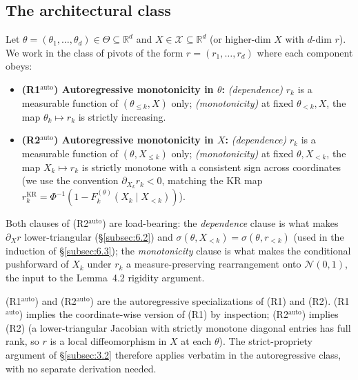 \documentclass[11pt]{article}
\providecommand{\tightlist}{\setlength{\itemsep}{0pt}\setlength{\parskip}{0pt}}
\begin{document}
\subsection{The architectural class}\label{subsec:6.1}

Let
\(\theta = (\theta_1, \ldots, \theta_d) \in \Theta \subseteq \mathbb{R}^d\)
and \(X \in \mathcal{X} \subseteq \mathbb{R}^d\) (or higher-dim \(X\)
with \(d\)-dim \(r\)). We work in the class of pivots of the form
\(r = (r_1, \ldots, r_d)\) where each component obeys:

\begin{itemize}
\tightlist
\item
  \textbf{(R1\(^\mathrm{auto}\)) Autoregressive monotonicity in
  \(\theta\):} \emph{(dependence)} \(r_k\) is a measurable function of
  \((\theta_{\le k}, X)\) only; \emph{(monotonicity)} at fixed
  \(\theta_{<k}, X\), the map \(\theta_k \mapsto r_k\) is strictly
  increasing.
\item
  \textbf{(R2\(^\mathrm{auto}\)) Autoregressive monotonicity in \(X\):}
  \emph{(dependence)} \(r_k\) is a measurable function of
  \((\theta, X_{\le k})\) only; \emph{(monotonicity)} at fixed
  \(\theta, X_{<k}\), the map \(X_k \mapsto r_k\) is strictly monotone
  with a consistent sign across coordinates (we use the convention
  \(\partial_{X_k} r_k < 0\), matching the KR map
  \(r_k^{\mathrm{KR}} = \Phi^{-1}(1 - F_k^{(\theta)}(X_k \mid X_{<k}))\)).
\end{itemize}

Both clauses of (R2\(^\mathrm{auto}\)) are load-bearing: the
\emph{dependence} clause is what makes \(\partial_X r\) lower-triangular
(\S\ref{subsec:6.2}) and \(\sigma(\theta, X_{<k}) = \sigma(\theta, r_{<k})\)
(used in the induction of \S\ref{subsec:6.3}); the \emph{monotonicity}
clause is what makes the conditional pushforward of \(X_k\) under
\(r_k\) a measure-preserving rearrangement onto \(\mathcal{N}(0,1)\),
the input to the Lemma~4.2 rigidity argument.

(R1\(^\mathrm{auto}\)) and (R2\(^\mathrm{auto}\)) are the autoregressive
specializations of (R1) and (R2). (R1\(^\mathrm{auto}\)) implies the
coordinate-wise version of (R1) by inspection; (R2\(^\mathrm{auto}\))
implies (R2) (a lower-triangular Jacobian with strictly monotone
diagonal entries has full rank, so \(r\) is a local diffeomorphism in
\(X\) at each \(\theta\)). The strict-propriety argument of
\S\ref{subsec:3.2} therefore applies verbatim in the autoregressive
class, with no separate derivation needed.
\end{document}
